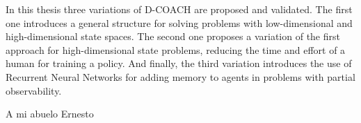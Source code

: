 \documentclass[upright, contnum]{umemoria}
\begin{document}
\begin{abstract_eng}
In this thesis three variations of D-COACH are proposed and validated. The first one introduces a general structure for solving problems with low-dimensional and high-dimensional state spaces. The second one proposes a variation of the first approach for high-dimensional state problems, reducing the time and effort of a human for training a policy. And finally, the third variation introduces the use of Recurrent Neural Networks for adding memory to agents in problems with partial observability.
\end{abstract_eng}


\begin{dedicatoria}
A mi abuelo Ernesto
\end{dedicatoria}

\begin{thanks}

\end{thanks}

\cleardoublepage
\tableofcontents
\cleardoublepage
\listoftables
\cleardoublepage
\listoffigures

\mainmatter








\nocite{*}
\newpage
{}




\end{document}
